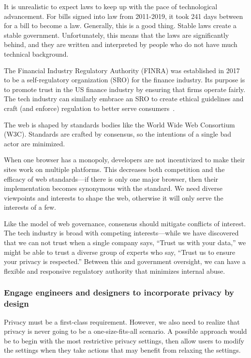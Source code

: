 It is unrealistic to expect laws to keep up with the pace of technological advancement. For bills signed into law from 2011-2019, it took 241 days between for a bill to become a law. Generally, this is a good thing. Stable laws create a stable government. Unfortunately, this means that the laws are significantly behind, and they are written and interpreted by people who do not have much technical background.

The Financial Industry Regulatory Authority (FINRA) was established in 2017 to be a self-regulatory organization (SRO) for the finance industry. Its purpose is to promote trust in the US finance industry by ensuring that firms operate fairly. The tech industry can similarly embrace an SRO to create ethical guidelines and craft (and enforce) regulation to better serve consumers~\cite{reich}.

The web is shaped by standards bodies like the World Wide Web Consortium (W3C). Standards are crafted by consensus, so the intentions of a single bad actor are minimized.

When one browser has a monopoly, developers are not incentivized to make their sites work on multiple platforms. This decreases both competition and the efficacy of web standards---if there is only one major browser, then their implementation becomes synonymous with the standard. We need diverse viewpoints and interests to shape the web, otherwise it will only serve the interests of a few.

Like the model of web governance, consensus should mitigate conflicts of interest. The tech industry is broad with competing interests---while we have discovered that we can not trust when a single company says, ``Trust us with your data,'' we might be able to trust a diverse group of experts who say, ``Trust us to ensure your privacy is respected.'' Between this and government oversight, we can have a flexible and responsive regulatory authority that minimizes internal abuse.

\subsubsection{Engage engineers and designers to incorporate privacy by design}

Privacy must be a first-class requirement. However, we also need to realize that privacy is never going to be a one-size-fits-all scenario. A possible approach would be to begin with the most restrictive privacy settings, then allow users to modify the settings when they take actions that may benefit from relaxing the settings.

